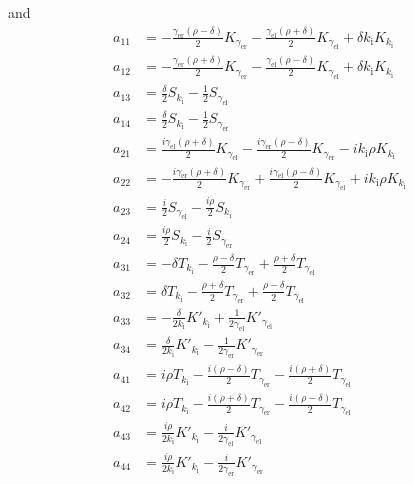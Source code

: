 and
\begin{align*}
  a_{11} &= -\frac{\gamma_\text{er}(\rho-\delta)}{2}K_{\gamma_\text{er}} - \frac{\gamma_\text{el}(\rho+\delta)}{2} K_{\gamma_\text{el}} + \delta k_\text{i} K_{k_\text{i}} \\
  a_{12} &= -\frac{\gamma_\text{er}(\rho+\delta)}{2}K_{\gamma_\text{er}} - \frac{\gamma_\text{el}(\rho-\delta)}{2} K_{\gamma_\text{el}} +\delta k_\text{i} K_{k_\text{i}} \\
  a_{13} &= \frac{\delta}{2}S_{k_\text{i}}-\frac{1}{2} S_{\gamma_\text{el}} \\
  a_{14} &= \frac{\delta}{2}S_{k_\text{i}}-\frac{1}{2} S_{\gamma_\text{er}} \\
  a_{21} &= \frac{i \gamma_\text{el}(\rho+\delta)}{2} K_{\gamma_\text{el}} - \frac{i \gamma_\text{er}(\rho-\delta)}{2} K_{\gamma_\text{er}} - i k_\text{i}\rho K_{k_\text{i}} \\
  a_{22} &= -\frac{i \gamma_\text{er}(\rho+\delta)}{2} K_{\gamma_\text{er}} + \frac{i \gamma_\text{el}(\rho-\delta)}{2} K_{\gamma_\text{el}} +i k_\text{i}\rho K_{k_\text{i}} \\
  a_{23} &= \frac{i}{2} S_{\gamma_\text{el}} - \frac{i\rho}{2} S_{k_\text{i}} \\
  a_{24} &= \frac{i\rho}{2} S_{k_\text{i}} - \frac{i}{2} S_{\gamma_\text{er}} \\
  a_{31} &= -\delta T_{k_\text{i}}-\frac{\rho-\delta}{2} T_{\gamma_\text{er}} + \frac{\rho+\delta}{2} T_{\gamma_\text{el}} \\
  a_{32} &= \delta T_{k_\text{i}} - \frac{\rho+\delta}{2} T_{\gamma_\text{er}}+ \frac{\rho-\delta}{2} T_{\gamma_\text{el}} \\
  a_{33} &= -\frac{\delta}{2 k_\text{i}} K'_{k_\text{i}} + \frac{1}{2 \gamma_\text{el}} K'_{\gamma_\text{el}} \\
  a_{34} &= \frac{\delta}{2 k_\text{i}} K'_{k_\text{i}} - \frac{1}{2 \gamma_\text{er}} K'_{\gamma_\text{er}} \\
  a_{41} &= i \rho T_{k_\text{i}}-\frac{i(\rho-\delta)}{2} T_{\gamma_\text{er}} - \frac{i(\rho+\delta)}{2} T_{\gamma_\text{el}} \\
  a_{42} &= i \rho T_{k_\text{i}}-\frac{i(\rho+\delta)}{2} T_{\gamma_\text{er}} - \frac{i(\rho-\delta)}{2} T_{\gamma_\text{el}} \\
  a_{43} &= \frac{i\rho}{2 k_\text{i}} K'_{k_\text{i}} - \frac{i}{2 \gamma_\text{el}} K'_{\gamma_\text{el}} \\
  a_{44} &= \frac{i\rho}{2 k_\text{i}} K'_{k_\text{i}} - \frac{i}{2 \gamma_\text{er}} K'_{\gamma_\text{er}}
\end{align*}

